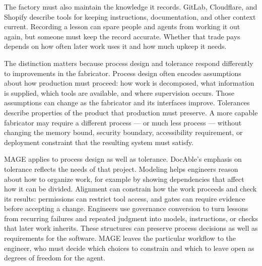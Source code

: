 
The factory must also maintain the knowledge it records. GitLab, Cloudflare, and Shopify describe tools for keeping instructions, documentation, and other context current. Recording a lesson can spare people and agents from working it out again, but someone must keep the record accurate. Whether that trade pays depends on how often later work uses it and how much upkeep it needs.


The distinction matters because process design and tolerance respond differently to improvements in the fabricator. Process design often encodes assumptions about how production must proceed: how work is decomposed, what information is supplied, which tools are available, and where supervision occurs. Those assumptions can change as the fabricator and its interfaces improve. Tolerances describe properties of the product that production must preserve. A more capable fabricator may require a different process --- or much less process --- without changing the memory bound, security boundary, accessibility requirement, or deployment constraint that the resulting system must satisfy.


MAGE applies to process design as well as tolerance. DocAble's emphasis on tolerance reflects the needs of that project. Modeling helps engineers reason about how to organize work, for example by showing dependencies that affect how it can be divided. Alignment can constrain how the work proceeds and check its results: permissions can restrict tool access, and gates can require evidence before accepting a change. Engineers use governance conversion to turn lessons from recurring failures and repeated judgment into models, instructions, or checks that later work inherits. These structures can preserve process decisions as well as requirements for the software. MAGE leaves the particular workflow to the engineer, who must decide which choices to constrain and which to leave open as degrees of freedom for the agent.

